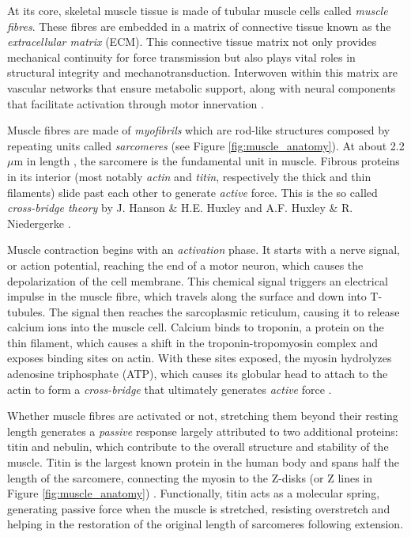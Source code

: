 \documentclass{sfuthesis}
\numberwithin{equation}{section}
\numberwithin{figure}{chapter}
\numberwithin{table}{chapter}
\theoremstyle{definition}
\begin{document}
At its core, skeletal muscle tissue is made of tubular muscle cells called \textit{muscle fibres}. These fibres are embedded in a matrix of connective tissue known as the \textit{extracellular matrix} (ECM). 
This connective tissue matrix not only provides mechanical continuity for force transmission but also plays vital roles in structural integrity and mechanotransduction. Interwoven within this matrix are vascular networks that ensure metabolic support, along with neural components that facilitate activation through motor innervation \cite{GilliesLieber2011ECM,Lieber2010Book, Mahdy2019}. 

Muscle fibres are made of \textit{myofibrils} which are rod-like structures composed by repeating units called \textit{sarcomeres} (see Figure \ref{fig:muscle_anatomy}). At about 2.2 $\mu$m in length \cite{burkholder2001sarcomere}, the sarcomere is the fundamental unit in muscle. Fibrous proteins in its interior (most notably \textit{actin} and \textit{titin}, respectively the thick and thin filaments) slide past each other to generate \textit{active} force. This is the so called \textit{cross-bridge theory} by J. Hanson \& H.E. Huxley \cite{HansonHuxley1953} and A.F. Huxley \& R. Niedergerke \cite{HuxleyNiedergerke1954}.

Muscle contraction begins with an \textit{activation} phase. It starts with a nerve signal, or action potential, reaching the end of a motor neuron, which causes the depolarization of the cell membrane. This chemical signal triggers an electrical impulse in the muscle fibre, which travels along the surface and down into T-tubules. The signal then reaches the sarcoplasmic reticulum, causing it to release calcium ions into the muscle cell. Calcium binds to troponin, a protein on the thin filament, which causes a shift in the troponin-tropomyosin complex and exposes binding sites on actin. With these sites exposed, the myosin hydrolyzes adenosine triphosphate (ATP), which causes its globular head to attach to the actin to form a \textit{cross-bridge} that ultimately generates \textit{active} force \cite{Ruegg2012Calcium}.

Whether muscle fibres are activated or not, stretching them beyond their resting length generates a \textit{passive} response largely attributed to two additional proteins: titin and nebulin, which contribute to the overall structure and stability of the muscle. Titin is the largest known protein in the human body and spans half the length of the sarcomere, connecting the myosin to the Z-disks (or Z lines in Figure \ref{fig:muscle_anatomy}) \cite{Nishikawa2020, Nishikawa2012WindingFilament}. Functionally, titin acts as a molecular spring, generating passive force when the muscle is stretched, resisting overstretch and helping in the restoration of the original length of sarcomeres following extension.
\end{document}
